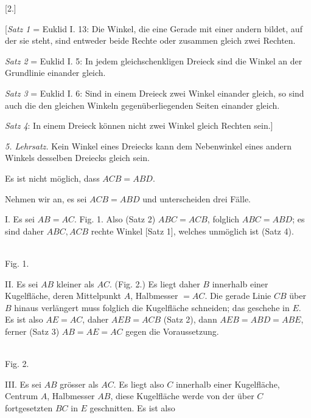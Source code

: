 \begin{center}[2.]\end{center}


[\emph{Satz 1} = Euklid I. 13: Die Winkel, die eine Gerade mit einer andern
bildet, auf der sie steht, sind entweder beide Rechte oder zusammen gleich
zwei Rechten.

\emph{Satz 2} = Euklid I. 5: In jedem gleichschenkligen Dreieck sind die
Winkel an der Grundlinie einander gleich.

\emph{Satz 3} = Euklid I. 6: Sind in einem Dreieck zwei Winkel einander
gleich, so sind auch die den gleichen Winkeln gegenüberliegenden Seiten einander gleich.

\emph{Satz 4}: In einem Dreieck können nicht zwei Winkel gleich Rechten
sein.]

\emph{5. Lehrsatz.} Kein Winkel eines Dreiecks kann dem Nebenwinkel eines
andern Winkels desselben Dreiecks gleich sein.

Es ist nicht möglich, dass $ACB = ABD$.

 Nehmen wir an, es sei $ACB = ABD$ und unterscheiden drei
Fälle.

I. Es sei $AB = AC$. Fig. 1. Also (Satz 2) $ABC = ACB$, folglich
$ABC = ABD$; es sind daher $ABC, ACB$ rechte Winkel [Satz 1], welches
unmöglich ist (Satz 4).



\begin{center}
\\[3pt]Fig. 1.
\end{center}

II. Es sei $AB$ kleiner als $AC$. (Fig. 2.) Es liegt daher $B$ innerhalb
einer Kugelfläche, deren Mittelpunkt $A$, Halbmesser $=AC$. Die gerade Linie
$CB$ über $B$ hinaus verlängert muss folglich die Kugelfläche schneiden; das
geschehe in $E$. Es ist also $AE=AC$, daher $AEB=ACB$ (Satz 2), dann
$AEB=ABD=ABE$, ferner (Satz 3) $AB=AE=AC$ gegen die Voraussetzung.



\begin{center}
\\[3pt]Fig. 2.
\end{center}

III. Es sei $AB$ grösser als $AC$. Es liegt also $C$ innerhalb einer
Kugelfläche, Centrum $A$, Halbmesser $AB$, diese Kugelfläche werde von der
über $C$ fortgesetzten $BC$ in $E$ geschnitten. Es ist also
